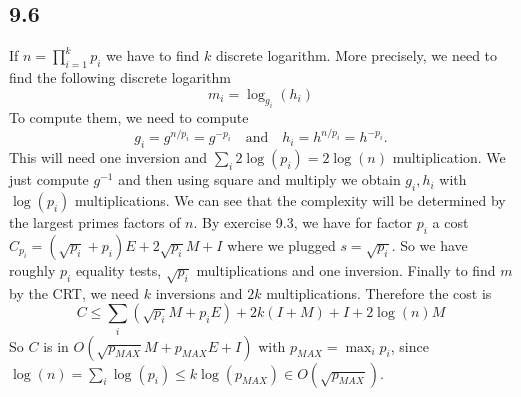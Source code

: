 \documentclass[12pt,a4paper]{article}
\begin{document}
\subsection{9.6}
If $n = \prod_{i=1}^{k}p_i$  we have to find $k$ discrete logarithm. 
More precisely, we need to find the following discrete logarithm
\[
    m_i = \log_{g_i}(h_i)
\]
To compute them, we need to compute 
\[
    g_i = g^{n/p_i} = g^{-p_i} \quad \mbox{and} \quad h_i = h^{n/p_i} = h^{-p_i}. 
\]
This will need one inversion and $\sum_i 2\log(p_i) = 2\log(n)$ multiplication. We just compute $g^{-1}$ and then using square and multiply we
obtain $g_i,h_i$ with $\log(p_i)$ multiplications.
We can see that the complexity will be determined by the largest primes factors of $n$.
By exercise 9.3, we have for factor $p_i$ a cost $C_{p_i} = (\sqrt{p_i} + p_i)E + 2\sqrt{p_i}M + I$ where we plugged $s = \sqrt{p_i}$. 
So we have roughly $p_i$ equality tests, $\sqrt{p_i}$ multiplications and one inversion.
Finally to find $m$ by the CRT, we need $k$ inversions and $2k$ multiplications. 
Therefore the cost is 
\[
    C \leq \sum_i{(\sqrt{p_i}M + p_i E)} + 2k(I+M) + I + 2\log(n)M
\]
So $C$ is in $O(\sqrt{p_{MAX}}M + p_{MAX}E + I)$ with $p_{MAX} = \max_ip_i$, since $\log(n) = \sum_i\log(p_i) \leq k\log(p_{MAX})\in O(\sqrt{p_{MAX}})$.
\end{document}
